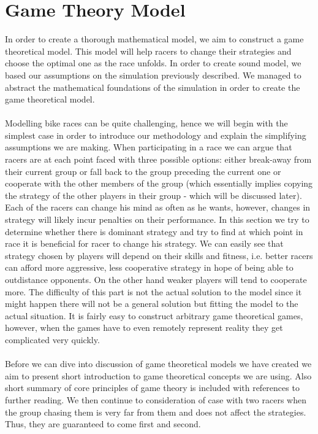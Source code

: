 \documentclass[10pt, a4paper]{report}
\begin{document}

\section{Game Theory Model}\label{sec:gameth}

In order to create a thorough mathematical model, we aim to construct a game theoretical model. This model will help racers to change their strategies and choose the optimal one as the race unfolds. In order to create sound model, we based our assumptions on the simulation previously described. We managed to abstract the mathematical foundations of the simulation in order to create the game theoretical model.\\\\
Modelling bike races can be quite challenging, hence we will begin with the simplest case in order to introduce our methodology and explain the simplifying assumptions we are making. When participating in a race we can argue that racers are at each point faced with three possible options: either break-away from their current group or fall back to the group preceding the current one or cooperate with the other members of the group (which essentially implies copying the strategy of the other players in their group - which will be discussed later). Each of the racers can change his mind as often as he wants, however, changes in strategy will likely incur penalties on their performance. In this section we try to determine whether there is dominant strategy and try to find at which point in race it is beneficial for racer to change his strategy. We can easily see that strategy chosen by players will depend on their skills and fitness, i.e. better racers can afford more aggressive, less cooperative strategy in hope of being able to outdistance opponents. On the other hand weaker players will tend to cooperate more. The difficulty of this part is not the actual solution to the model since it might happen there will not be a general solution but fitting the model to the actual situation. It is fairly easy to construct arbitrary game theoretical games, however, when the games have to even remotely represent reality they get complicated very quickly.\\\\
Before we can dive into discussion of game theoretical models we have created we aim to present short introduction to game theoretical concepts we are using. Also short summary of core principles of game theory is included with references to further reading. We then continue to consideration of case with two racers when the group chasing them is very far from them and does not affect the strategies. Thus, they are guaranteed to come first and second.
\end{document}
